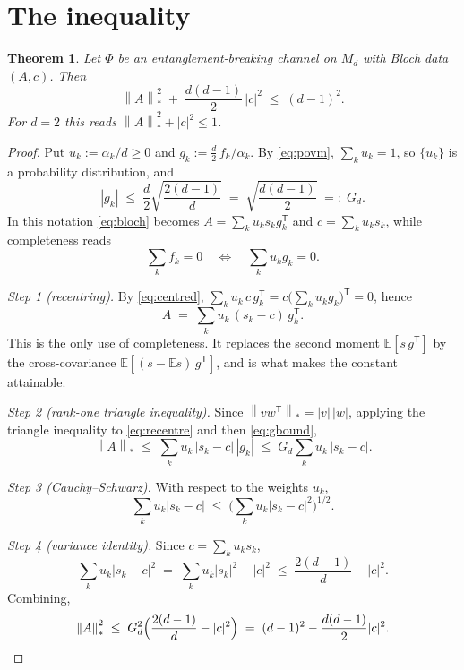 \documentclass[11pt,a4paper]{article}
\newtheorem{theorem}{Theorem}
\theoremstyle{remark}
\newcommand{\nuc}[1]{\left\lVert #1 \right\rVert_{*}}
\begin{document}
\section{The inequality}

\begin{theorem}\label{thm:main}
Let $\Phi$ be an entanglement-breaking channel on $M_d$ with Bloch data $(A,c)$. Then
\[
\nuc{A}^2 \;+\; \frac{d(d-1)}{2}\,|c|^2 \;\le\; (d-1)^2 .
\]
For $d=2$ this reads $\nuc{A}^2+|c|^2\le1$.
\end{theorem}

\begin{proof}
Put $u_k := \alpha_k/d \ge 0$ and $g_k := \tfrac{d}{2}\,f_k/\alpha_k$. By \eqref{eq:povm}, $\sum_k u_k=1$, so $\{u_k\}$ is a probability distribution, and
\begin{equation}\label{eq:gbound}
|g_k| \;\le\; \frac{d}{2}\sqrt{\frac{2(d-1)}{d}} \;=\; \sqrt{\frac{d(d-1)}{2}} \;=:\; G_d .
\end{equation}
In this notation \eqref{eq:bloch} becomes $A=\sum_k u_k s_k g_k^{\mathsf T}$ and $c=\sum_k u_k s_k$, while completeness reads
\begin{equation}\label{eq:centred}
\sum_k f_k=0 \quad\Longleftrightarrow\quad \sum_k u_k g_k = 0 .
\end{equation}

\emph{Step 1 (recentring).} By \eqref{eq:centred}, $\sum_k u_k\,c\,g_k^{\mathsf T} = c\big(\sum_k u_k g_k\big)^{\mathsf T} = 0$, hence
\begin{equation}\label{eq:recentre}
A \;=\; \sum_k u_k\,(s_k-c)\,g_k^{\mathsf T}.
\end{equation}
This is the only use of completeness. It replaces the second moment $\mathbb{E}[s\,g^{\mathsf T}]$ by the cross-covariance $\mathbb{E}[(s-\mathbb{E}s)\,g^{\mathsf T}]$, and is what makes the constant attainable.

\emph{Step 2 (rank-one triangle inequality).} Since $\nuc{vw^{\mathsf T}}=|v|\,|w|$, applying the triangle inequality to \eqref{eq:recentre} and then \eqref{eq:gbound},
\[
\nuc{A} \;\le\; \sum_k u_k\,|s_k-c|\,|g_k| \;\le\; G_d\sum_k u_k\,|s_k-c| .
\]

\emph{Step 3 (Cauchy--Schwarz).} With respect to the weights $u_k$,
\[
\sum_k u_k|s_k-c| \;\le\; \Big(\sum_k u_k|s_k-c|^2\Big)^{1/2}.
\]

\emph{Step 4 (variance identity).} Since $c=\sum_k u_k s_k$,
\[
\sum_k u_k|s_k-c|^2 \;=\; \sum_k u_k|s_k|^2 - |c|^2 \;\le\; \frac{2(d-1)}{d}-|c|^2 .
\]
Combining,
\[
\nuc{A}^2 \;\le\; G_d^2\Big(\frac{2(d-1)}{d}-|c|^2\Big) \;=\; (d-1)^2-\frac{d(d-1)}{2}|c|^2 . \qedhere
\]
\end{proof}
\end{document}

